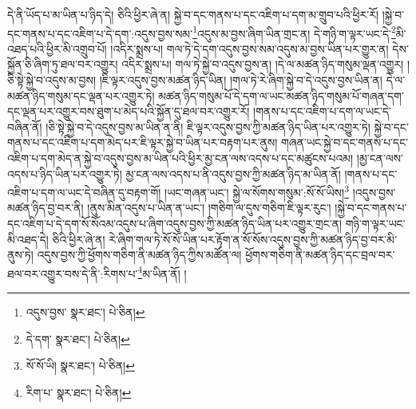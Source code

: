 དེ་ནི་ཡོད་པ་མ་ཡིན་པ་ཉིད་དེ། ཅིའི་ཕྱིར་ཞེ་ན། སྐྱེ་བ་དང་གནས་པ་དང་འཇིག་པ་དག་མ་གྲུབ་པའི་ཕྱིར་རོ། །སྐྱེ་བ་དང་གནས་པ་དང་འཇིག་པ་དེ་དག་:འདུས་བྱས་སམ་\footnote{འདུས་བྱས་  སྣར་ཐང་།  པེ་ཅིན། }འདུས་མ་བྱས་ཞིག་ཡིན་གྲང་ན། དེ་གཉི་ག་ལྟར་ཡང་དེ་\footnote{དེ་དག་  སྣར་ཐང་།  པེ་ཅིན། }མི་འཐད་པའི་ཕྱིར་མི་འགྲུབ་པོ། །འདིར་སྨྲས་པ། གལ་ཏེ་དེ་དག་འདུས་བྱས་སམ་འདུས་མ་བྱས་ཡིན་པར་གྱུར་ན། དེས་སྐྱོན་ཅི་ཞིག་ཏུ་ཐལ་བར་འགྱུར། འདིར་སྨྲས་པ། གལ་ཏེ་སྐྱེ་བ་འདུས་བྱས་ན། །དེ་ལ་མཚན་ཉིད་གསུམ་ལྡན་འགྱུར། །ཅི་སྟེ་སྐྱེ་བ་འདུས་མ་བྱས། །ཇི་ལྟར་འདུས་བྱས་མཚན་ཉིད་ཡིན། །གལ་ཏེ་རེ་ཞིག་སྐྱེ་བ་དེ་འདུས་བྱས་ཡིན་ན། དེ་ལ་མཚན་ཉིད་གསུམ་དང་ལྡན་པར་འགྱུར་ཏེ། མཚན་ཉིད་གསུམ་པོ་དེ་དག་ལ་ཡང་མཚན་ཉིད་གསུམ་པོ་གཞན་དག་དང་ལྡན་པར་འགྱུར་བས་ཐུག་པ་མེད་པའི་སྐྱོན་དུ་ཐལ་བར་འགྱུར་རོ། །གནས་པ་དང་འཇིག་པ་དག་ལ་ཡང་དེ་བཞིན་ནོ། །ཅི་སྟེ་སྐྱེ་བ་དེ་འདུས་བྱས་མ་ཡིན་ན་ནི། ཇི་ལྟར་འདུས་བྱས་ཀྱི་མཚན་ཉིད་ཡིན་པར་འགྱུར་ཏེ། སྐྱེ་བ་དང་གནས་པ་དང་འཇིག་པ་དག་མེད་པར་ཇི་ལྟར་སྐྱེ་བ་ཡིན་པར་བརྟག་པར་ནུས། གཞན་ཡང་སྐྱེ་བ་དང་གནས་པ་དང་འཇིག་པ་དག་མེད་ན་སྐྱེ་བ་འདུས་བྱས་མ་ཡིན་པའི་ཕྱིར་མྱ་ངན་ལས་འདས་པ་དང་མཚུངས་པའམ། །མྱ་ངན་ལས་འདས་པ་ཉིད་ཡིན་པར་འགྱུར་ཏེ། མྱ་ངན་ལས་འདས་པ་ནི་འདུས་བྱས་ཀྱི་མཚན་ཉིད་མ་ཡིན་ནོ། །གནས་པ་དང་འཇིག་པ་དག་ལ་ཡང་དེ་བཞིན་དུ་བརྟག་གོ། །ཡང་གཞན་ཡང་། སྐྱེ་ལ་སོགས་གསུམ་:སོ་སོ་ཡིས།\footnote{སོ་སོ་ཡི།  སྣར་ཐང་།  པེ་ཅིན། } །འདུས་བྱས་མཚན་ཉིད་བྱ་བར་ནི། །ནུས་མིན་འདུས་པ་ཡིན་ན་ཡང་། །གཅིག་ལ་དུས་གཅིག་ཇི་ལྟར་རུང་། །སྐྱེ་བ་དང་གནས་པ་དང་འཇིག་པ་དེ་དག་སོ་སོའམ་འདུས་པ་ཞིག་འདུས་བྱས་ཀྱི་མཚན་ཉིད་ཡིན་པར་འགྱུར་གྲང་ན། གཉི་ག་ལྟར་ཡང་མི་འཐད་དེ། ཅིའི་ཕྱིར་ཞེ་ན། རེ་ཞིག་གལ་ཏེ་སོ་སོ་ཡིན་པར་རྟོག་ན་སོ་སོས་འདུས་བྱས་ཀྱི་མཚན་ཉིད་བྱ་བར་མི་ནུས་ཏེ། འདུས་བྱས་ཀྱི་ཕྱོགས་གཅིག་ནི་མཚན་ཉིད་ཀྱིས་མཚོན་ལ། ཕྱོགས་གཅིག་ནི་མཚན་ཉིད་དང་བྲལ་བར་ཐལ་བར་འགྱུར་བས་དེ་ནི་:རིགས་པ་\footnote{རིག་པ་  སྣར་ཐང་།  པེ་ཅིན། }མ་ཡིན་ནོ། །
